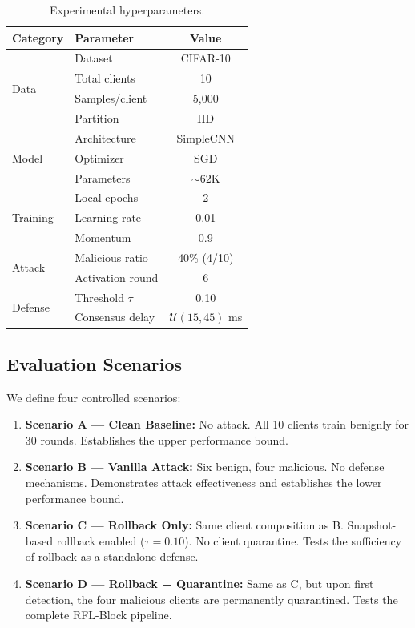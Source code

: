 \documentclass[conference]{IEEEtran}
\begin{document}
\begin{table}[t]
\centering
\caption{Experimental hyperparameters.}
\label{tab:hyperparams}
\vspace{-3pt}
\begin{tabular}{llc}
\toprule
\textbf{Category} & \textbf{Parameter} & \textbf{Value} \\
\midrule
\multirow{4}{*}{Data}
& Dataset & CIFAR-10 \\
& Total clients & 10 \\
& Samples/client & 5,000 \\
& Partition & IID \\
\midrule
\multirow{3}{*}{Model}
& Architecture & SimpleCNN \\
& Optimizer & SGD \\
& Parameters & $\sim 62$K \\
\midrule
\multirow{3}{*}{Training}
& Local epochs & 2 \\
& Learning rate & 0.01 \\
& Momentum & 0.9 \\
\midrule
\multirow{2}{*}{Attack}
& Malicious ratio & 40\% (4/10) \\
& Activation round & 6 \\
\midrule
\multirow{2}{*}{Defense}
& Threshold $\tau$ & 0.10 \\
& Consensus delay & $\mathcal{U}(15,45)$ ms \\
\bottomrule
\end{tabular}
\end{table}

\subsection{Evaluation Scenarios}
We define four controlled scenarios:

\begin{enumerate}
    \item \textbf{Scenario A — Clean Baseline:} No attack. All 10 clients train benignly for 30 rounds. Establishes the upper performance bound.
    \item \textbf{Scenario B — Vanilla Attack:} Six benign, four malicious. No defense mechanisms. Demonstrates attack effectiveness and establishes the lower performance bound.
    \item \textbf{Scenario C — Rollback Only:} Same client composition as B. Snapshot-based rollback enabled ($\tau=0.10$). No client quarantine. Tests the sufficiency of rollback as a standalone defense.
    \item \textbf{Scenario D — Rollback + Quarantine:} Same as C, but upon first detection, the four malicious clients are permanently quarantined. Tests the complete RFL-Block pipeline.
\end{enumerate}
\end{document}
